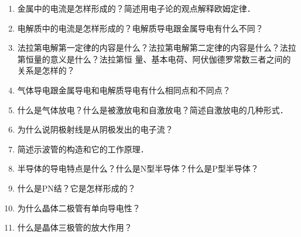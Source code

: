 \begin{enumerate}
    \item 金属中的电流是怎样形成的？简述用电子论的观点解释欧姆定律．
    \item 电解质中的电流是怎样形成的？电解质导电跟金属导电有什么不同？
    \item 法拉第电解第一定律的内容是什么？法拉第电解第二定律的内容是什么？法拉第恒量的意义是什么？法拉第恒
    量、基本电荷、阿伏伽德罗常数三者之间的关系是怎样的？
    \item 气体导电跟金属导电和电解质导电有什么相同点和不同点？
    \item 什么是气体放电？什么是被激放电和自激放电？简述自激放电的几种形式．
    \item 为什么说阴极射线是从阴极发出的电子流？
    \item 简述示波管的构造和它的工作原理．
    \item 半导体的导电特点是什么？什么是N型半导体？什么是P型半导体？
    \item 什么是PN结？它是怎样形成的？
    \item 为什么晶体二极管有单向导电性？
    \item 什么是晶体三极管的放大作用？
\end{enumerate}



